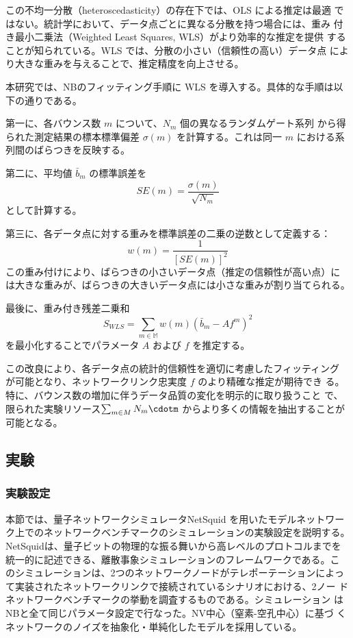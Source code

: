 \documentclass[conference]{IEEEtran}
\begin{document}
この不均一分散（heteroscedasticity）の存在下では、OLS による推定は最適
ではない。統計学において、データ点ごとに異なる分散を持つ場合には、重み
付き最小二乗法（Weighted Least Squares, WLS）がより効率的な推定を提供
することが知られている。WLS では、分散の小さい（信頼性の高い）データ点
により大きな重みを与えることで、推定精度を向上させる。

本研究では、NBのフィッティング手順に WLS を導入する。具体的な手順は以
下の通りである。

第一に、各バウンス数 \(m\) について、\(N_m\) 個の異なるランダムゲート系列
から得られた測定結果の標本標準偏差 \(\sigma(m)\) を計算する。これは同一
\(m\) における系列間のばらつきを反映する。

第二に、平均値 \(\bar{b}_m\) の標準誤差を
\begin{equation}
SE(m) = \frac{\sigma(m)}{\sqrt{N_m}}
\end{equation}
として計算する。

第三に、各データ点に対する重みを標準誤差の二乗の逆数として定義する：
\begin{equation}
w(m) = \frac{1}{[SE(m)]^2}
\end{equation}
この重み付けにより、ばらつきの小さいデータ点（推定の信頼性が高い点）に
は大きな重みが、ばらつきの大きいデータ点には小さな重みが割り当てられる。

最後に、重み付き残差二乗和
\begin{equation}
S_{WLS} = \sum_{m \in \mathbb{M}} w(m) (\bar{b}_m - A f^m)^2
\end{equation}
を最小化することでパラメータ \(A\) および \(f\) を推定する。

この改良により、各データ点の統計的信頼性を適切に考慮したフィッティング
が可能となり、ネットワークリンク忠実度 \(f\) のより精確な推定が期待でき
る。特に、バウンス数の増加に伴うデータ品質の変化を明示的に取り扱うこと
で、限られた実験リソース\(\sum_{m \in M} N_m \cdotm\)
からより多くの情報を抽出することが可能となる。


\subsection*{実験}
\label{sec:org0df2ce2}
\subsubsection*{実験設定}
\label{sec:orga2c350e}
本節では、量子ネットワークシミュレータNetSquid を用いたモデルネットワー
ク上でのネットワークベンチマークのシミュレーションの実験設定を説明する。
NetSquidは、量子ビットの物理的な振る舞いから高レベルのプロトコルまでを
統一的に記述できる、離散事象シミュレーションのフレームワークである。こ
のシミュレーションは、2つのネットワークノードがテレポーテーションによっ
て実装されたネットワークリンクで接続されているシナリオにおける、2ノー
ドネットワークベンチマークの挙動を調査するものである。シミュレーション
はNBと全て同じパラメータ設定で行なった。NV中心（窒素-空孔中心）に基づ
くネットワークのノイズを抽象化・単純化したモデルを採用している。
\end{document}
